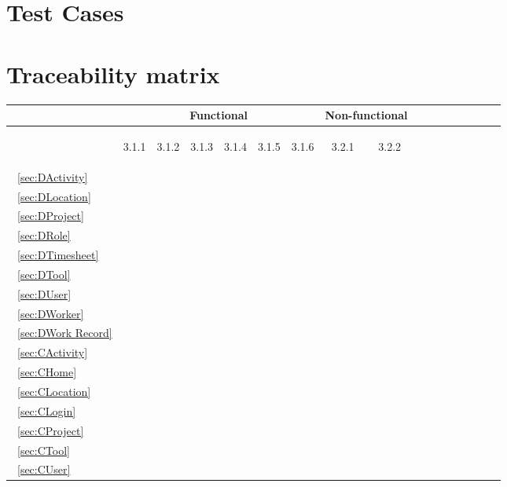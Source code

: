 \documentclass[12pt]{article}
\renewcommand{\c}{\checkmark}
\newcommand{\s}[1] {\begin{sideways}#1\end{sideways}}
\begin{document}
\section{Test Cases}


\section{Traceability matrix}
\begin{center}
\begin{tabular}{|l||*{12}{c|}|*{4}{c|}}
\hline
\multicolumn{1}{|c||}{ }&
\multicolumn{6}{|c||}{Functional} &
\multicolumn{2}{|c|}{Non-functional}\\
\hline
	& \s{3.1.1} & \s{3.1.2}&\s{3.1.3}&\s{3.1.4}&\s{3.1.5}&\s{3.1.6}&\s{3.2.1}&\s{3.2.2} \\
\hline
~\ref{sec:DActivity}	&&&&&&&&\\
~\ref{sec:DLocation}	&&&&&&&&\\
~\ref{sec:DProject}		&&&&&&&&\\
~\ref{sec:DRole}		&\c&&&&&&&\\
~\ref{sec:DTimesheet}	&&&&&&&&\\
~\ref{sec:DTool}		&&&&&&&&\\
~\ref{sec:DUser}		&\c&&&&&&&\\
~\ref{sec:DWorker}		&\c&&&&&&&\\
~\ref{sec:DWork Record}	&&&&&&&&\\
\hline
~\ref{sec:CActivity}	&&&&&&&&\\
~\ref{sec:CHome}		&&&&&&&&\\
~\ref{sec:CLocation}	&&&&&&&&\\
~\ref{sec:CLogin}		&\c&&&&&&&\\
~\ref{sec:CProject}		&&&&&&&&\\
~\ref{sec:CTool}		&&&&&&&&\\
~\ref{sec:CUser}		&\c&&&&&&&\\
\hline
\end{tabular}
\end{center}
\end{document}
